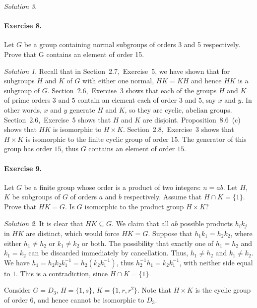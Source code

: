 \documentclass[11pt]{report}
\theoremstyle{remark}
\newtheorem*{solution}{Solution}
\begin{document}
\begin{solution}
    \paragraph{Exercise 8.} Let $G$ be a group containing normal subgroups of orders
    3 and 5 respectively. Prove that G contains an element of order 15.
    \begin{solution}
        Recall that in Section~2.7,~Exercise~5, we have shown that for subgroups $H$
        and $K$ of $G$ with either one normal, $HK = KH$ and hence $HK$ is a
        subgroup of $G$. Section~2.6,~Exercise~3 shows that each of the
        groups $H$ and $K$ of prime orders $3$ and $5$ contain an element each of
        order $3$ and $5$, say $x$ and $y$. In other words, $x$ and $y$ generate
        $H$ and $K$, so they are cyclic, abelian groups. Section~2.6,~Exercise~5
        shows that $H$ and $K$ are disjoint. Proposition~8.6~(c) shows that $HK$ is
        isomorphic to $H \times K$. Section~2.8,~Exercise~3 shows that $H\times K$
        is isomorphic to the finite cyclic group of order $15$. The generator of
        this group has order $15$, thus $G$ contains an element of order $15$.
    \end{solution}

    \paragraph{Exercise 9.} Let $G$ be a finite group whose order is a product of
    two integers: $n = ab$. Let $H$, $K$ be subgroups of $G$ of orders $a$ and $b$
    respectively. Assume that $H \cap K = \{1\}$. Prove that $HK = G$. Is $G$
    isomorphic to the product group $H \times K$?
    \begin{solution}
        It is clear that $HK \subseteq G$. We claim that all $ab$ possible products
        $h_ik_j$ in $HK$ are distinct, which would force $HK = G$. Suppose that
        $h_1k_1 = h_2k_2$, where either $h_1 \neq h_2$ or $k_1 \neq k_2$ or both.
        The possibility that exactly one of $h_1 = h_2$ and $k_1 = k_2$ can be
        discarded immediately by cancellation. Thus, $h_1 \neq h_2$ and $k_1 \neq
        k_2$. We have $h_1 = h_2k_2k_1^{-1} = h_2 (k_2k_1^{-1})$, thus $h_2^{-1}h_1
        = k_2k_1^{-1}$, with neither side equal to $1$. This is a contradiction,
        since $H \cap K = \{1\}$.

        Consider $G = D_3$, $H = \{1, s\}$, $K = \{1, r, r^2\}$. Note that $H \times
        K$ is the cyclic group of order $6$, and hence cannot be isomorphic to
        $D_3$.
    \end{solution}


\end{solution}
\end{document}
